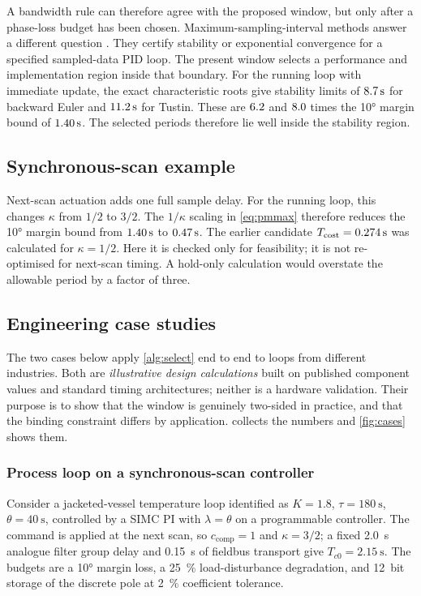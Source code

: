 \documentclass[a4paper,fleqn]{cas-sc}
\theoremstyle{remark}
\newcommand{\Tcost}{T_{\mathrm{cost}}}
\begin{document}
A bandwidth rule can therefore agree with the proposed window, but only after a phase-loss budget has been chosen. Maximum-sampling-interval methods answer a different question \citep{wang2025impulsive}. They certify stability or exponential convergence for a specified sampled-data PID loop. The present window selects a performance and implementation region inside that boundary. For the running loop with immediate update, the exact characteristic roots give stability limits of $\SI{8.7}{\second}$ for backward Euler and $\SI{11.2}{\second}$ for Tustin. These are $6.2$ and $8.0$ times the \ang{10} margin bound of $\SI{1.40}{\second}$. The selected periods therefore lie well inside the stability region.

\subsection{Synchronous-scan example}
Next-scan actuation adds one full sample delay. For the running loop, this changes $\kappa$ from $1/2$ to $3/2$. The $1/\kappa$ scaling in \cref{eq:pmmax} therefore reduces the \ang{10} margin bound from $\SI{1.40}{\second}$ to $\SI{0.47}{\second}$. The earlier candidate $\Tcost=\SI{\RunTcost}{\second}$ was calculated for $\kappa=1/2$. Here it is checked only for feasibility; it is not re-optimised for next-scan timing. A hold-only calculation would overstate the allowable period by a factor of three.

\FloatBarrier
\subsection{Engineering case studies}
\label{sec:cases}
The two cases below apply \cref{alg:select} end to end to loops from
different industries. Both are \emph{illustrative design calculations} built
on published component values and standard timing architectures; neither is a
hardware validation. Their purpose is to show that the window is genuinely
two-sided in practice, and that the binding constraint differs by
application.  collects the numbers and
\cref{fig:cases} shows them.

\subsubsection{Process loop on a synchronous-scan controller}
Consider a jacketed-vessel temperature loop identified as
$K=1.8$, $\tau=\SI{180}{\second}$, $\theta=\SI{40}{\second}$, controlled by a
SIMC PI with $\lambda=\theta$ on a programmable controller. The command is
applied at the next scan, so $c_{\mathrm{comp}}=1$ and $\kappa=3/2$; a fixed
\SI{2.0}{\second} analogue filter group delay and \SI{0.15}{\second} of
fieldbus transport give $T_{c0}=\SI{2.15}{\second}$. The budgets are a
\ang{10} margin loss, a \SI{25}{\percent} load-disturbance degradation, and
\SI{12}{bit} storage of the discrete pole at \SI{2}{\percent} coefficient
tolerance.
\end{document}

